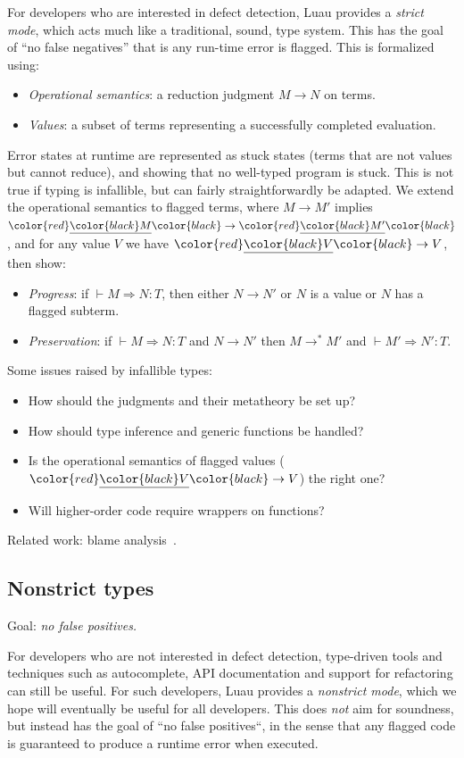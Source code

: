 \documentclass[acmsmall]{acmart}
\newcommand{\squnder}[1]{\color{red}\underline{{\color{black}#1}}\color{black}}
\begin{document}
For developers who are interested in defect detection, Luau provides a \emph{strict mode},
which acts much like a traditional, sound, type system. This has the goal of ``no false negatives'' that is any
run-time error is flagged. This is formalized using:
\begin{itemize}
\item \emph{Operational semantics}: a reduction judgment $M \rightarrow N$ on terms.
\item \emph{Values}: a subset of terms representing a successfully completed evaluation.
\end{itemize}
Error states at runtime are represented as stuck states (terms that are not
values but cannot reduce), and showing that no well-typed program is
stuck. This is not true if typing is infallible, but can fairly
straightforwardly be adapted. We extend the operational semantics to flagged terms,
where $M \rightarrow M'$ implies $\squnder{M} \rightarrow \squnder{M'}$, and
for any value $V$ we have $\squnder{V} \rightarrow V$, then show:
\begin{itemize}
\item \emph{Progress}: if ${} \vdash M \Rightarrow N : T$, then either $N \rightarrow N'$ or $N$ is a value or $N$ has a flagged subterm.
\item \emph{Preservation}: if ${} \vdash M \Rightarrow N : T$ and $N \rightarrow N'$ then  $M \rightarrow^*M'$ and ${} \vdash M' \Rightarrow N' : T$.
\end{itemize}
Some issues raised by infallible types:
\begin{itemize}
\item How should the judgments and their metatheory be set up?
\item How should type inference and generic functions be handled?
\item Is the operational semantics of flagged values
  ($\squnder{V} \rightarrow V$) the right one?
\item Will higher-order code require wrappers on functions? 
\end{itemize}
Related work: blame analysis~\cite{???}.

\subsection{Nonstrict types}

Goal: \emph{no false positives.}

For developers who are not interested in defect detection, type-driven
tools and techniques such as autocomplete, API documentation
and support for refactoring can still be useful.
For such developers, Luau provides a
\emph{nonstrict mode}, which we hope will eventually be useful for all
developers. This does \emph{not} aim for soundness, but instead has
the goal of ``no false positives``, in the sense that any flagged code
is guaranteed to produce a runtime error when executed.
\end{document}
